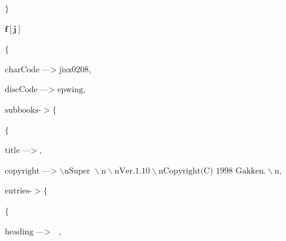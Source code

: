 \documentclass{article}
\newcommand{\unicode}[1]{{}}
\begin{document}
\noindent\(\}\)

\begin{doublespace}
\noindent\(\pmb{f[j]}\)
\end{doublespace}

\noindent\(\{\)

\noindent\(\text{charCode}\text{---$>$}\text{jisx0208},\)

\noindent\(\text{discCode}\text{---$>$}\text{epwing},\)

\noindent\(\text{subbooks}\text{-$>\{$}\)

\noindent\(\{\)

\noindent\(\text{title}\text{---$>$}\unicode{5b66}\unicode{7814}\unicode{56fd}\unicode{8a9e}\unicode{5927}\unicode{8f9e}\unicode{5178},\)

\noindent\(\text{copyright}\text{---$>$}\text{$\backslash $nSuper $\unicode{65e5}\unicode{672c}\unicode{8a9e}\unicode{5927}\unicode{8f9e}\unicode{5178}\backslash
$n$\unicode{5b66}\unicode{7814}\unicode{56fd}\unicode{8a9e}\unicode{5927}\unicode{8f9e}\unicode{5178}\backslash $nVer.1.10$\backslash $nCopyright(C)
1998 Gakken.$\backslash $n},\)

\noindent\(\text{entries}\text{-$>\{$}\)

\noindent\(\{\)

\noindent\(\text{heading}\text{---$>$}\text{$\unicode{305d}\unicode{3089}\unicode{3010}\unicode{7a7a}\unicode{3011}$ $\unicode{5f62}\unicode{5bb9}\unicode{52d5}\unicode{8a5e}$},\)
\end{document}
